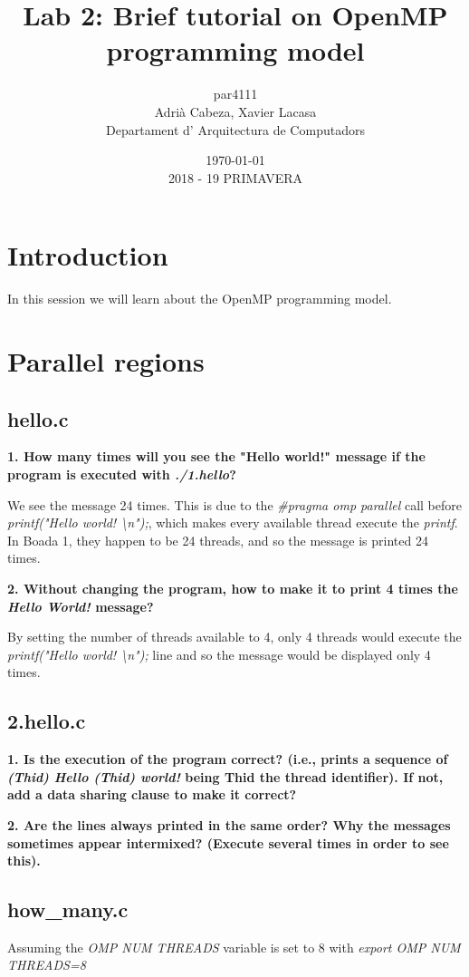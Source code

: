 \documentclass[12]{article}
\author{par4111 \\ Adrià Cabeza, Xavier Lacasa \\ Departament d' Arquitectura de Computadors}
\title{Lab 2: Brief tutorial on OpenMP programming model }
\date{\today \\ 2018 - 19 PRIMAVERA}
\begin{document}
\maketitle

\newpage
\tableofcontents
\newpage
\section{Introduction}

In this session we will learn about the OpenMP programming model. 

\section{Parallel regions}
\subsection{hello.c}
\textbf{1. How many times will you see the "Hello world!" message if the program is executed with \textit{./1.hello}?}

We see the message 24 times. This is due to the \textit{\#pragma omp parallel} call before \textit{printf("Hello world! \textbackslash n");}, which makes every available thread execute the \textit{printf}. In Boada 1, they happen to be 24 threads, and so the message is printed 24 times.

\textbf{2. Without changing the program, how to make it to print 4 times the \textit{Hello World!} message?}

By setting the number of threads available to 4, only 4 threads would execute the \textit{printf("Hello world! \textbackslash n");} line and so the message would be displayed only 4 times. 

\subsection{2.hello.c}
\textbf{1. Is the execution of the program correct? (i.e., prints a sequence of \textit{(Thid) Hello (Thid)
world!} being Thid the thread identifier). If not, add a data sharing clause to make it correct?} 

\textbf{2. Are the lines always printed in the same order? Why the messages sometimes appear intermixed?
(Execute several times in order to see this).}

\subsection{how\_many.c}
Assuming the \textit{OMP NUM THREADS} variable is set to 8 with \textit{export OMP NUM THREADS=8}
\end{document}
